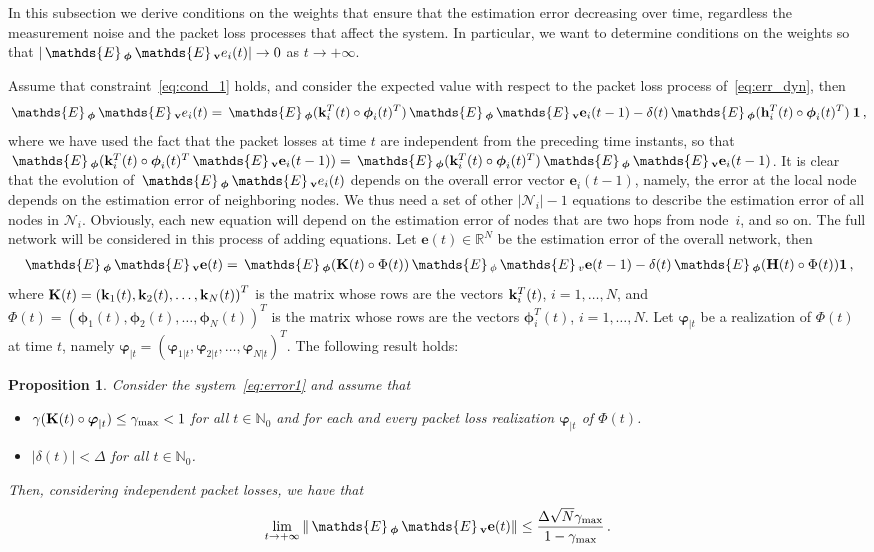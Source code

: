 \documentclass[a4paper,notitlepage,onecolumn]{article}
\def\1{\mathbf{1}}
\def\N{\mathds{N}}
\def\R{\mathds{R}}
\def\K{{\cal K}}
\def\k{{\bf k}}
\def\h{{\bf h}}
\def\v{{\bf v}}
\def\K{{\bf K}}
\def\H{{\bf H}}
\def\phib{\boldsymbol{\phi}}
\def\varphib{\boldsymbol{\varphi}}
\def\E{\,\mathds{E}\,}
\newtheorem{proposition}[theorem]{Proposition}
\numberwithin{equation}{section}
\begin{document}
In this subsection we derive conditions on the weights that ensure
that the estimation error decreasing over time, regardless the
measurement noise and the packet loss processes that affect the
system. In particular, we want to determine conditions on the
weights so that $|\E_{\phib}\E_\v e_i(t)|\rightarrow 0$ as
$t\rightarrow +\infty$.

Assume that constraint~\eqref{eq:cond_1} holds, and consider the
expected value with respect to the packet loss process
of~\eqref{eq:err_dyn}, then
$$
    \E_{\phib} \E_\v e_i(t) = \E_{\phib} (\k_i^T(t) \circ \phib_i(t)^T)
    \E_{\phib} \E_\v \mathbf{e}_i(t-1) - \delta(t) \E_{\phib} (\h_i^T(t) \circ \phib_i(t)^T)\:\1 \,,
$$
where we have used the fact that the packet losses at time $t$ are
independent from the preceding time instants, so that $\E_{\phib}(
\k_i^T(t) \circ \phib_i(t)^T \E_\v \mathbf{e}_i(t-1)) =\E_{\phib}
(\k_i^T(t) \circ \phib_i(t)^T)  \E_{\phib} \E_\v
\mathbf{e}_i(t-1)$. It is clear that the evolution of
$\E_{\phib}\E_\v e_i(t)$ depends on the overall error vector
$\mathbf{e}_i(t-1)$, namely, the error at the local node depends
on the estimation error of neighboring nodes. We thus need a set
of other $|\mathcal{N}_i|-1$ equations to describe the estimation
error of all nodes in $\mathcal{N}_i$. Obviously, each new
equation will depend on the estimation error of nodes that are two
hops from node~$i$, and so on. The full network will be considered
in this process of adding equations. Let $\mathbf{e}(t) \in
\R^{N}$ be the estimation error of the overall network, then
\begin{align}
    \E_{\phib} \E_\v \mathbf{e}(t) = \E_{\phib} (\K(t) \circ \Phi(t)) \E_\phi
    \E_v \mathbf{e}(t-1) - \delta(t) \E_{\phib} (\H(t) \circ \Phi(t)) \1 \,,
    \label{eq:error1}
\end{align}
where $\K(t) = \left( \k_1(t), \k_2(t), \dots, \k_N(t) \right)^T$ is the matrix whose rows are the vectors $\k_i^T(t)$, $i=1,\dots,N$,
and $\Phi(t) = \left( \phib_1(t), \phib_2(t), \dots, \phib_N(t) \right)^T$ is the matrix whose rows are the vectors $\phib_i^T(t)$, $i=1,\dots,N$. Let $\varphib_{|t}$ be a realization of $\Phi(t)$ at time $t$, namely $\varphib_{|t} = \left( \varphib_{1|t}, \varphib_{2|t}, \dots, \varphib_{N|t} \right)^T$. The following result holds:
\begin{proposition}
\label{prop:error-stability} Consider the
system~\eqref{eq:error1} and assume that
\begin{itemize}
\item[(i)]  $\gamma(\K(t) \circ
    \varphib_{|t})\leq\gamma_{\max}<1$ for all $t\in \N_0$ and
    for each and every packet loss realization $\varphib_{|t}$
    of $\Phi(t)$.
\item[(ii)] $|\delta(t)|<\Delta$ for all $t\in \N_0$.
\end{itemize}
Then, considering independent packet losses, we have that
\begin{align}
    \lim_{t\rightarrow +\infty}  \|\E_{\phib} \E_\v \mathbf{e}(t)\|
    \leq \frac{\Delta \sqrt{N}\gamma_{\max}}{1-\gamma_{\max}}\,.
    \label{eq:error_bound}
\end{align}
\end{proposition}
\end{document}
